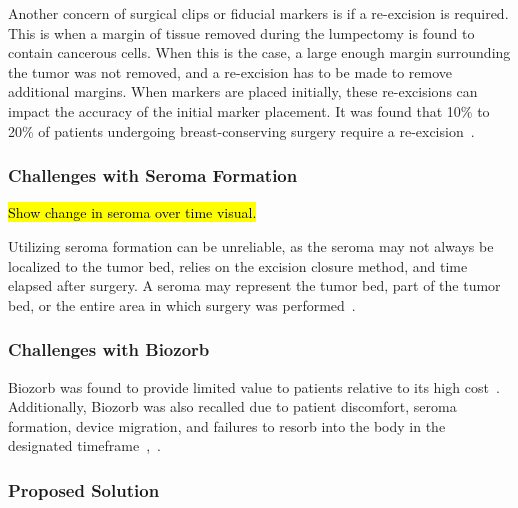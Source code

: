 Another concern of surgical clips or fiducial markers is if a re-excision is required. This is when a margin of tissue removed during the lumpectomy is found to contain cancerous cells. When this is the case, a large enough margin surrounding the tumor was not removed, and a re-excision has to be made to remove additional margins. When markers are placed initially, these re-excisions can impact the accuracy of the initial marker placement. It was found that 10\% to 20\% of patients undergoing breast-conserving surgery require a re-excision~\cite{RefWorks:RefID:25-acree2022review}.

\subsubsection*{Challenges with Seroma Formation\label{sec:introduction:motivation:challengeswithcurrentdevicesandmethods:challengeswithseromaformation}}
\hl{Show change in seroma over time visual.\\}

Utilizing seroma formation can be unreliable, as the seroma may not always be localized to the tumor bed, relies on the excision closure method, and time elapsed after surgery\cite{RefWorks:RefID:25-acree2022review}. A seroma may represent the tumor bed, part of the tumor bed, or the entire area in which surgery was performed~\cite{RefWorks:RefID:344-mitchell2019adaptable}.

\subsubsection*{Challenges with Biozorb}
Biozorb was found to provide limited value to patients relative to its high cost~\cite{RefWorks:RefID:344-mitchell2019adaptable}. Additionally, Biozorb was also recalled due to patient discomfort, seroma formation, device migration, and failures to resorb into the body in the designated timeframe~\cite{RefWorks:RefID:296-2024hologic},~\cite{RefWorks:RefID:28-nudelunited}.

\subsubsection{Proposed Solution\label{sec:introduction:motivation:proposedsolution}}
